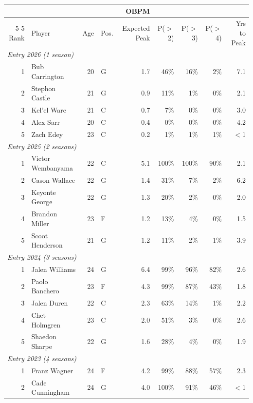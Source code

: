 \begin{table}[htbp]
  \centering\small
  \begin{tabular}{rlrlrrrrr}
    \toprule
     & & & & OBPM & & & & \\
    \cmidrule(lr){5-5}
    Rank & Player & Age & Pos. & Expected Peak & P($>$2) & P($>$3) & P($>$4) & Yrs to Peak \\
    \midrule
    \multicolumn{9}{l}{\textit{Entry 2026 (1 season)}} \\
    \midrule
    1 & Bub Carrington & 20 & G & 1.7 & 46\% & 16\% & 2\% & 7.1 \\
    2 & Stephon Castle & 21 & G & 0.9 & 11\% & 1\% & 0\% & 2.1 \\
    3 & Kel'el Ware & 21 & C & 0.7 & 7\% & 0\% & 0\% & 3.0 \\
    4 & Alex Sarr & 20 & C & 0.4 & 0\% & 0\% & 0\% & 4.2 \\
    5 & Zach Edey & 23 & C & 0.2 & 1\% & 1\% & 1\% & $<$1 \\
    \midrule[0.4pt]
    \multicolumn{9}{l}{\textit{Entry 2025 (2 seasons)}} \\
    \midrule
    1 & Victor Wembanyama & 22 & C & 5.1 & 100\% & 100\% & 90\% & 2.1 \\
    2 & Cason Wallace & 22 & G & 1.4 & 31\% & 7\% & 2\% & 6.2 \\
    3 & Keyonte George & 22 & G & 1.3 & 20\% & 2\% & 0\% & 2.0 \\
    4 & Brandon Miller & 23 & F & 1.2 & 13\% & 4\% & 0\% & 1.5 \\
    5 & Scoot Henderson & 21 & G & 1.2 & 11\% & 2\% & 1\% & 3.9 \\
    \midrule[0.4pt]
    \multicolumn{9}{l}{\textit{Entry 2024 (3 seasons)}} \\
    \midrule
    1 & Jalen Williams & 24 & G & 6.4 & 99\% & 96\% & 82\% & 2.6 \\
    2 & Paolo Banchero & 23 & F & 4.3 & 99\% & 87\% & 43\% & 1.8 \\
    3 & Jalen Duren & 22 & C & 2.3 & 63\% & 14\% & 1\% & 2.2 \\
    4 & Chet Holmgren & 23 & C & 2.0 & 51\% & 3\% & 0\% & 2.6 \\
    5 & Shaedon Sharpe & 22 & G & 1.6 & 28\% & 4\% & 0\% & 1.9 \\
    \midrule[0.4pt]
    \multicolumn{9}{l}{\textit{Entry 2023 (4 seasons)}} \\
    \midrule
    1 & Franz Wagner & 24 & F & 4.2 & 99\% & 88\% & 57\% & 2.3 \\
    2 & Cade Cunningham & 24 & G & 4.0 & 100\% & 91\% & 46\% & $<$1 \\

\end{tabular}
\end{table}

